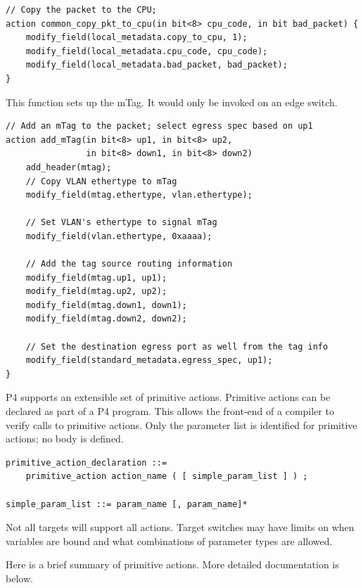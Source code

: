 \documentclass[12pt]{article}
\begin{document}
\begin{lstlisting}[style=P4style]
// Copy the packet to the CPU;
action common_copy_pkt_to_cpu(in bit<8> cpu_code, in bit bad_packet) {
    modify_field(local_metadata.copy_to_cpu, 1);
    modify_field(local_metadata.cpu_code, cpu_code);
    modify_field(local_metadata.bad_packet, bad_packet);
}
\end{lstlisting}

This function sets up the mTag. It would only be invoked on an edge switch.

\begin{lstlisting}[style=P4style]
// Add an mTag to the packet; select egress spec based on up1
action add_mTag(in bit<8> up1, in bit<8> up2,
                in bit<8> down1, in bit<8> down2)
    add_header(mtag);
    // Copy VLAN ethertype to mTag
    modify_field(mtag.ethertype, vlan.ethertype);

    // Set VLAN's ethertype to signal mTag
    modify_field(vlan.ethertype, 0xaaaa);

    // Add the tag source routing information
    modify_field(mtag.up1, up1);
    modify_field(mtag.up2, up2);
    modify_field(mtag.down1, down1);
    modify_field(mtag.down2, down2);

    // Set the destination egress port as well from the tag info
    modify_field(standard_metadata.egress_spec, up1);
}
\end{lstlisting}


P4 supports an extensible set of primitive actions. Primitive actions can 
be declared as part of a P4 program. This allows the front-end of a compiler 
to verify calls to primitive actions. Only the parameter list is identified 
for primitive actions; no body is defined. 

\begin{lstlisting}[style=BNFstyle]
primitive_action_declaration ::= 
    primitive_action action_name ( [ simple_param_list ] ) ;

simple_param_list ::= param_name [, param_name]*
\end{lstlisting}

Not all targets will support all actions. Target switches may have
limits on when variables are bound and what combinations of parameter
types are allowed.

Here is a brief summary of primitive actions. More detailed documentation 
is below.
\end{document}
